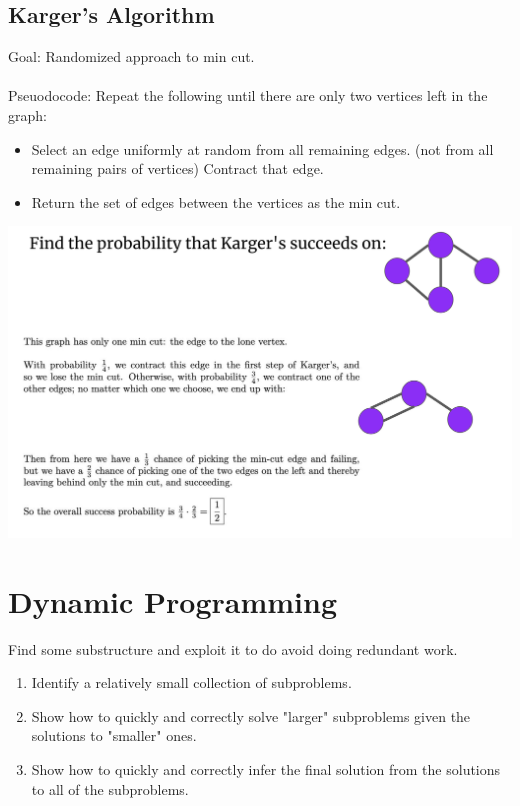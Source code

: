 \documentclass[12pt]{article}
\begin{document}
\subsection*{Karger's Algorithm}
Goal: Randomized approach to min cut. 
\\\\
Pseuodocode: Repeat the following until there are only two vertices left in the graph:
\begin{itemize}
    \item Select an edge uniformly at random from all remaining edges. (not from all remaining pairs of vertices) Contract that edge.
    \item Return the set of edges between the vertices as the min cut.
\end{itemize}
\begin{center}
\includegraphics[scale=0.3]{kargerex.png} 
\end{center}

\newpage
\section{Dynamic Programming}
Find some substructure and exploit it to do avoid doing redundant work. 

\begin{mdframed}
\begin{enumerate}
    \item Identify a relatively small collection of subproblems. 
    \item Show how to quickly and correctly solve "larger" subproblems given the solutions to "smaller" ones. 
    \item Show how to quickly and correctly infer the final solution from the solutions to all of the subproblems. 
\end{enumerate}
\end{mdframed}
\end{document}
